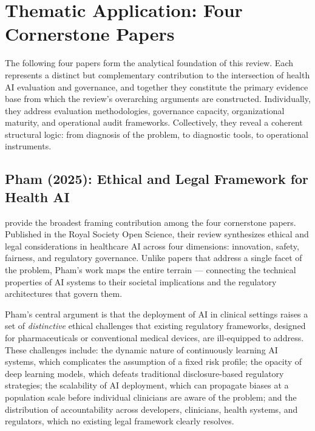 
\section{Thematic Application: Four Cornerstone Papers}
\label{sec:thematic}

The following four papers form the analytical foundation of this review.
Each represents a distinct but complementary contribution to the intersection
of health AI evaluation and governance, and together they constitute the
primary evidence base from which the review's overarching arguments are
constructed. Individually, they address evaluation methodologies, governance
capacity, organizational maturity, and operational audit frameworks.
Collectively, they reveal a coherent structural logic: from diagnosis of the
problem, to diagnostic tools, to operational instruments.

\subsection{Pham (2025): Ethical and Legal Framework for Health AI}
\label{sec:pham}

\citet{pham2025ethical} provide the broadest framing contribution among the
four cornerstone papers. Published in the Royal Society Open Science, their
review synthesizes ethical and legal considerations in healthcare AI across
four dimensions: innovation, safety, fairness, and regulatory governance.
Unlike papers that address a single facet of the problem, Pham's work maps
the entire terrain — connecting the technical properties of AI systems to
their societal implications and the regulatory architectures that govern them.

Pham's central argument is that the deployment of AI in clinical settings
raises a set of \textit{distinctive} ethical challenges that existing
regulatory frameworks, designed for pharmaceuticals or conventional medical
devices, are ill-equipped to address. These challenges include: the dynamic
nature of continuously learning AI systems, which complicates the assumption
of a fixed risk profile; the opacity of deep learning models, which defeats
traditional disclosure-based regulatory strategies; the scalability of AI
deployment, which can propagate biases at a population scale before
individual clinicians are aware of the problem; and the distribution of
accountability across developers, clinicians, health systems, and regulators,
which no existing legal framework clearly resolves.

